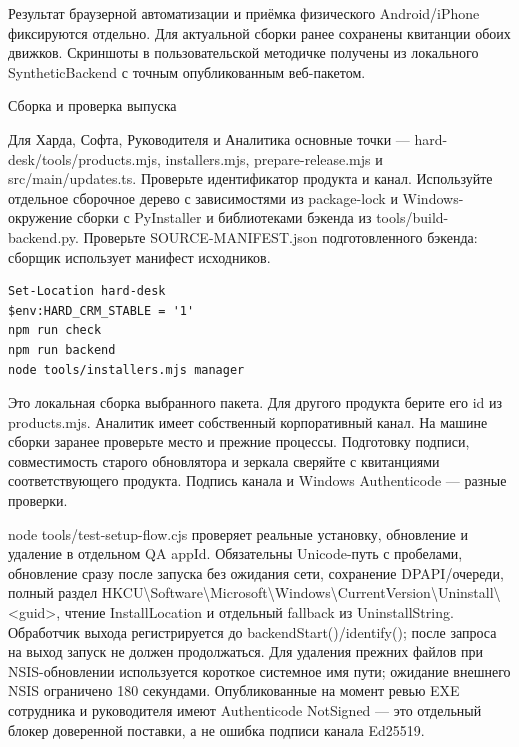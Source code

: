 \documentclass[12pt,a4paper]{article}
\newcommand{\chapterhead}[1]{{\fontsize{23}{27}\selectfont #1\par}\vspace{5pt}}
\newcommand{\subhead}[1]{\par\vspace{4pt}{\large\sffamily\bfseries\color{accent}#1\par}\nopagebreak}
\begin{document}
Результат браузерной автоматизации и приёмка физического Android/iPhone фиксируются отдельно. Для актуальной сборки ранее сохранены квитанции обоих движков. Скриншоты в пользовательской методичке получены из локального SyntheticBackend с точным опубликованным веб-пакетом.\par
\clearpage
{}
\label{ch12}\chapterhead{Сборка и проверка выпуска}
\subhead{Windows}
Для Харда, Софта, Руководителя и Аналитика основные точки — {\small\ttfamily hard-\allowbreak{}desk/\allowbreak{}tools/\allowbreak{}products.\allowbreak{}mjs}, {\small\ttfamily installers.\allowbreak{}mjs}, {\small\ttfamily prepare-\allowbreak{}release.\allowbreak{}mjs} и {\small\ttfamily src/\allowbreak{}main/\allowbreak{}updates.\allowbreak{}ts}. Проверьте идентификатор продукта и канал. Используйте отдельное сборочное дерево с зависимостями из package-lock и Windows-окружение сборки с PyInstaller и библиотеками бэкенда из tools/build-backend.py. Проверьте SOURCE-MANIFEST.json подготовленного бэкенда: сборщик использует манифест исходников.\par
{\footnotesize\begin{verbatim}
Set-Location hard-desk
$env:HARD_CRM_STABLE = '1'
npm run check
npm run backend
node tools/installers.mjs manager
\end{verbatim}}
Это локальная сборка выбранного пакета. Для другого продукта берите его id из products.mjs. Аналитик имеет собственный корпоративный канал. На машине сборки заранее проверьте место и прежние процессы. Подготовку подписи, совместимость старого обновлятора и зеркала сверяйте с квитанциями соответствующего продукта. Подпись канала и Windows Authenticode — разные проверки.\par
{\small\ttfamily node tools/\allowbreak{}test-\allowbreak{}setup-\allowbreak{}flow.\allowbreak{}cjs} проверяет реальные установку, обновление и удаление в отдельном QA appId. Обязательны Unicode-путь с пробелами, обновление сразу после запуска без ожидания сети, сохранение DPAPI/очереди, полный раздел {\small\ttfamily HKCU\textbackslash{}Software\textbackslash{}Microsoft\textbackslash{}Windows\textbackslash{}CurrentVersion\textbackslash{}Uninstall\textbackslash{}<guid>}, чтение {\small\ttfamily InstallLocation} и отдельный fallback из {\small\ttfamily UninstallString}. Обработчик выхода регистрируется до {\small\ttfamily backendStart()}/{\small\ttfamily identify()}; после запроса на выход запуск не должен продолжаться. Для удаления прежних файлов при NSIS-обновлении используется короткое системное имя пути; ожидание внешнего NSIS ограничено 180 секундами. Опубликованные на момент ревью EXE сотрудника и руководителя имеют Authenticode {\small\ttfamily NotSigned} — это отдельный блокер доверенной поставки, а не ошибка подписи канала Ed25519.\par
\end{document}
